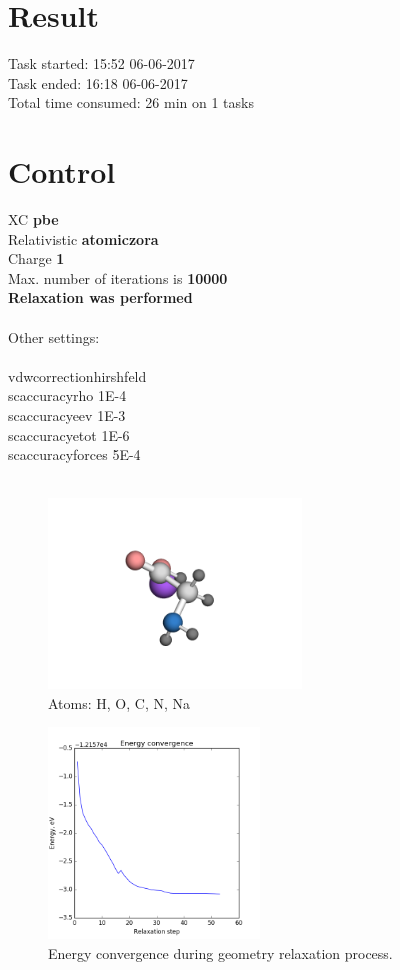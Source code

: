 \documentclass[12pt,a4paper,twocolumn]{report}
\begin{document}
\section*{Result}
Task started: \hfill 15:52 06-06-2017
\\
Task ended: \hfill 16:18 06-06-2017
\\
Total time consumed: 26 min on 1 tasks\\
\section*{Control}
XC  \hfill \textbf{pbe}\\
Relativistic  \hfill \textbf{atomic\textunderscore zora}\\
Charge  \hfill \textbf{1}\\
Max. number of iterations is \hfill \textbf{10000}\\
\textbf{Relaxation was performed\\}
\\
Other settings:\\
\\
vdw\textunderscore correction\textunderscore hirshfeld\\
sc\textunderscore accuracy\textunderscore rho    1E-4\\
sc\textunderscore accuracy\textunderscore eev    1E-3\\
sc\textunderscore accuracy\textunderscore etot   1E-6\\
sc\textunderscore accuracy\textunderscore forces 5E-4\\
\\
\newpage
\begin{figure}[h!]
\caption{Atoms: H, O, C, N, Na } 
\includegraphics[width=0.6\textwidth]{geometry.png}
\end{figure}
\begin{figure}[H]
\caption{Energy convergence during geometry relaxation process.} 
\includegraphics[width=0.5\textwidth]{energy_convergence.png}
\end{figure}
\end{document}
